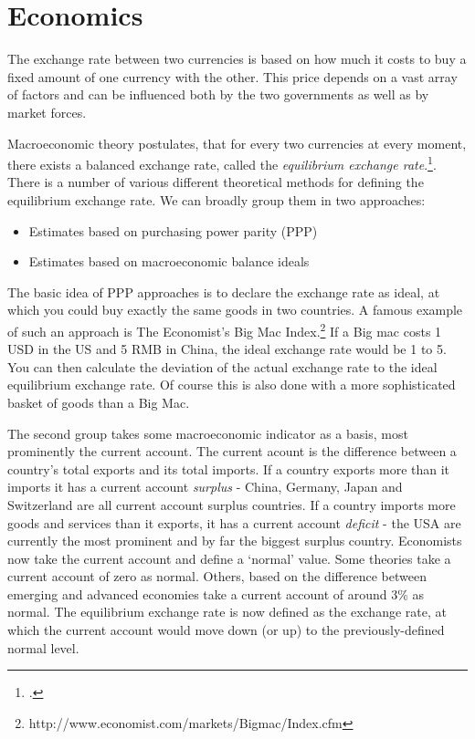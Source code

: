 \section{Economics}

The exchange rate between two currencies is based on how much it 
costs to buy a fixed amount of one currency with the other. This price 
depends on a vast array of factors and can be influenced both by the two 
governments as well as by market forces.  

Macroeconomic theory postulates, that for every two currencies at every 
moment, there exists a balanced exchange rate, called the 
\emph{equilibrium exchange rate}.\footnote{\cite[pp. 505]{Krugman2008}.}. There is a number of various different theoretical methods for defining the equilibrium exchange rate. We can broadly group them in two approaches: 

\begin{itemize}
\item{Estimates based on purchasing power parity (PPP)}
\item{Estimates based on macroeconomic balance ideals}
\end{itemize}

The basic idea of PPP approaches is to declare the exchange rate as ideal, at which you could buy exactly the same goods in two countries. A famous example of such an approach is The Economist's Big Mac Index.\footnote{http://www.economist.com/markets/Bigmac/Index.cfm} If a Big mac costs 1 USD in the US and 5 RMB in China, the ideal exchange rate would be 1 to 5. You can then calculate the deviation of the actual exchange rate to the ideal equilibrium exchange rate. Of course this is also done with a more sophisticated basket of goods than a Big Mac. 

The second group takes some macroeconomic indicator as a basis, most prominently the current account. The current acount is the difference between a country's total exports and its total imports. If a country exports more than it imports it has a current account \emph{surplus} - China, Germany, Japan and Switzerland are all current account surplus countries. If a country imports more goods and services than it exports, it has a current account \emph{deficit} - the USA are currently the most prominent and by far the biggest surplus country. Economists now take the current account and define a `normal' value. Some theories take a current account of zero as normal. Others, based on the difference between emerging and advanced economies take a current account of around 3\% as normal. The equilibrium exchange rate is now defined as the exchange rate, at which the current account would move down (or up) to the previously-defined normal level.


